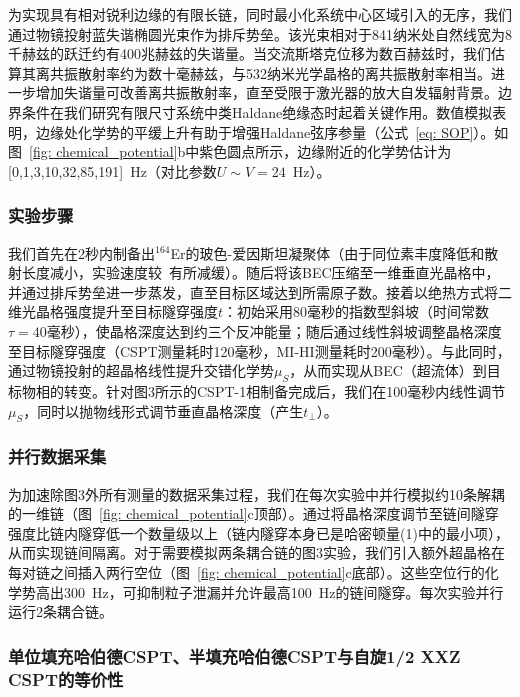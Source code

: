 \documentclass[preprint,superscriptaddress,floatfix,nofootinbib]{revtex4-2}
\begin{document}
为实现具有相对锐利边缘的有限长链，同时最小化系统中心区域引入的无序，我们通过物镜投射蓝失谐椭圆光束作为排斥势垒\cite{Gaunt2013}。该光束相对于841纳米处自然线宽为8千赫兹的跃迁约有400兆赫兹的失谐量。当交流斯塔克位移为数百赫兹时，我们估算其离共振散射率约为数十毫赫兹，与532纳米光学晶格的离共振散射率相当。进一步增加失谐量可改善离共振散射率，直至受限于激光器的放大自发辐射背景。边界条件在我们研究有限尺寸系统中类Haldane绝缘态时起着关键作用。数值模拟表明，边缘处化学势的平缓上升有助于增强Haldane弦序参量（公式~\eqref{eq: SOP}）。如图~\ref{fig: chemical_potential}b中紫色圆点所示，边缘附近的化学势估计为[0,1,3,10,32,85,191]~Hz（对比参数$U\sim V=24$~Hz）。
\subsubsection*{实验步骤}

我们首先在2秒内制备出$^{164}$Er的玻色-爱因斯坦凝聚体（由于同位素丰度降低和散射长度减小，实验速度较~\cite{Phelps2020}有所减缓）。随后将该BEC压缩至一维垂直光晶格中，并通过排斥势垒进一步蒸发，直至目标区域达到所需原子数。接着以绝热方式将二维光晶格强度提升至目标隧穿强度$t$：初始采用80毫秒的指数型斜坡（时间常数$\tau = 40$毫秒），使晶格深度达到约三个反冲能量；随后通过线性斜坡调整晶格深度至目标隧穿强度（CSPT测量耗时120毫秒，MI-HI测量耗时200毫秒）。与此同时，通过物镜投射的超晶格线性提升交错化学势$\mu_S$，从而实现从BEC（超流体）到目标物相的转变。针对图3所示的CSPT-1相制备完成后，我们在100毫秒内线性调节$\mu_S$，同时以抛物线形式调节垂直晶格深度（产生$t_\perp$）。
\subsubsection*{并行数据采集}

为加速除图3外所有测量的数据采集过程，我们在每次实验中并行模拟约10条解耦的一维链（图~\ref{fig: chemical_potential}c顶部）。通过将晶格深度调节至链间隧穿强度比链内隧穿低一个数量级以上（链内隧穿本身已是哈密顿量(1)中的最小项），从而实现链间隔离。对于需要模拟两条耦合链的图3实验，我们引入额外超晶格在每对链之间插入两行空位（图~\ref{fig: chemical_potential}c底部）。这些空位行的化学势高出300~Hz，可抑制粒子泄漏并允许最高100~Hz的链间隧穿。每次实验并行运行2条耦合链。
\subsubsection*{单位填充哈伯德CSPT、半填充哈伯德CSPT与自旋1/2 XXZ CSPT的等价性}
\end{document}
